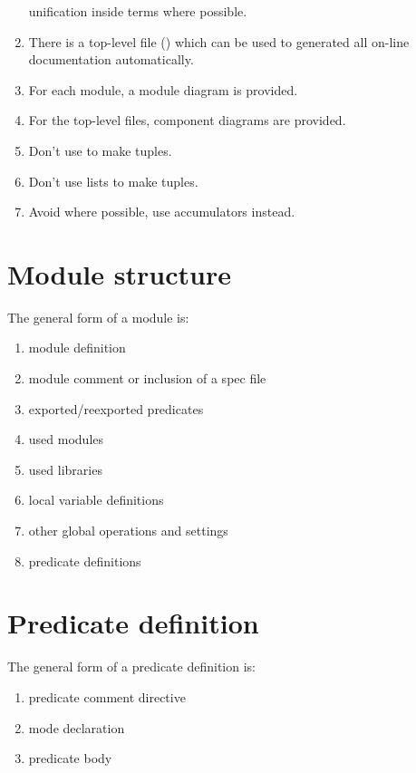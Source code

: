 \begin{enumerate}
  unification inside terms where possible.
\item  There is a top-level file () which can be used to
  generated all on-line documentation automatically.
\item  For each module, a module diagram is provided.
\item  For the top-level files, component diagrams are provided.
\item  Don't use  to make tuples.
\item  Don't use lists to make tuples.
\item  Avoid  where possible, use accumulators instead.
\end{enumerate}

\section{Module structure}
The general form of a module is:

\begin{enumerate}
\item  module definition
\item  module comment or inclusion of a spec file
\item  exported/reexported predicates
\item  used modules
\item  used libraries
\item  local variable definitions
\item  other global operations and settings
\item  predicate definitions
\end{enumerate}

\section{Predicate definition}
The general form of a predicate definition is:

\begin{enumerate}
\item  predicate comment directive
\item  mode declaration
\item  predicate body
\end{enumerate}

